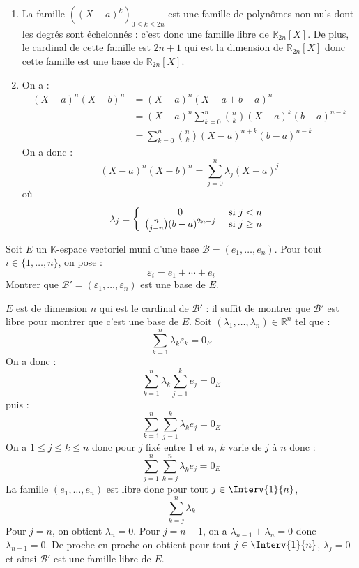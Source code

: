 \documentclass[a4paper,10pt]{report}
\begin{document}
\corr 

\begin{enumerate}
\item La famille $((X-a)^k)_{0 \leq k \leq 2n}$ est une famille de polynômes non nuls dont les degrés sont échelonnés : c'est donc une famille libre de $\mathbb{R}_{2n}[X]$. De plus, le cardinal de cette famille est $2n+1$ qui est la dimension de $\mathbb{R}_{2n}[X]$ donc cette famille est une base de $\mathbb{R}_{2n}[X]$.
\item On a :
\begin{align*}
(X-a)^n(X-b)^n & = (X-a)^n (X-a + b-a)^n \\
& = (X-a)^n \sum_{k=0}^n \binom{n}{k} (X-a)^k (b-a)^{n-k} \\
& = \sum_{k=0}^n \binom{n}{k} (X-a)^{n+k} (b-a)^{n-k} 
\end{align*}
On a donc :
$$ (X-a)^n(X-b)^n = \sum_{j=0}^n \lambda_j (X-a)^j$$
où 
$$ \lambda_j = \left\lbrace \begin{array}{ccl}
0 & \hbox{ si } j <n\\
\binom{n}{j-n} (b-a)^{2n-j} & \hbox{ si } j \geq n \\
\end{array}\right.$$
\end{enumerate}

\begin{Exercice}{} Soit $E$ un $\mathbb{K}$-espace vectoriel muni d'une base $\mathcal{B} = (e_1 , \ldots ,e_n)$. Pour tout $i \in \lbrace 1, \ldots ,n \rbrace$, on pose :
$$\varepsilon_i = e_1 + \cdots + e_i$$
Montrer que $\mathcal{B}' = (\varepsilon_1 , \ldots ,\varepsilon_n)$ est une base de $E$.
\end{Exercice} 

\corr $E$ est de dimension $n$ qui est le cardinal de $\mathcal{B}'$ : il suffit de montrer que $\mathcal{B}'$ est libre pour montrer que c'est une base de $E$. Soit $(\lambda_1, \ldots, \lambda_n) \in \mathbb{R}^n$ tel que :
$$ \sum_{k=1}^n \lambda_k \varepsilon_k = 0_E$$
On a donc :
$$ \sum_{k=1}^n \lambda_k  \sum_{j=1}^k e_j = 0_E$$
puis : 
$$ \sum_{k=1}^n   \sum_{j=1}^k \lambda_k e_j = 0_E$$
On a $1 \leq j \leq k \leq n$ donc pour $j$ fixé entre $1$ et $n$, $k$ varie de $j$ à $n$ donc :
$$ \sum_{j=1}^n   \sum_{k=j}^n \lambda_k e_j = 0_E$$
La famille $(e_1, \ldots, e_n)$ est libre donc pour tout $j \in \Interv{1}{n}$,
$$ \sum_{k=j}^n \lambda_k$$
Pour $j=n$, on obtient $\lambda_n=0$. Pour $j=n-1$, on a $\lambda_{n-1}+\lambda_n=0$ donc $\lambda_{n-1}=0$. De proche en proche on obtient pour tout $j \in \Interv{1}{n}$, $\lambda_j=0$ et ainsi $\mathcal{B}'$ est une famille libre de $E$.
\end{document}
